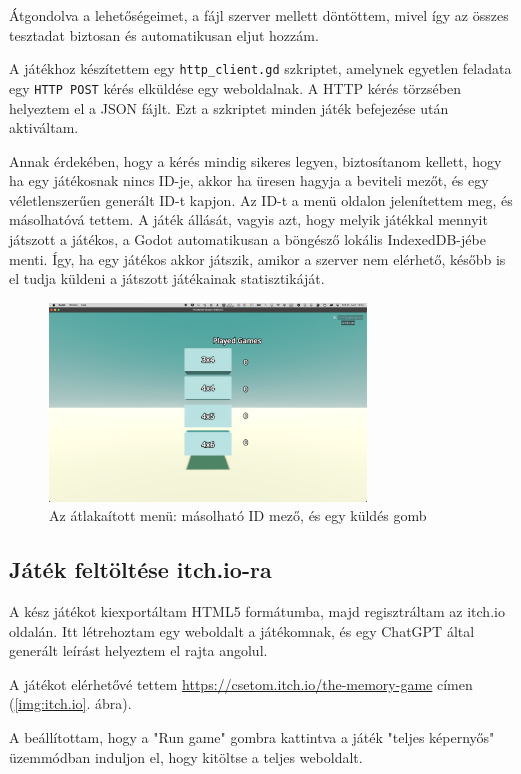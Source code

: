 Átgondolva a lehetőségeimet, a fájl szerver mellett döntöttem, mivel így az összes tesztadat biztosan és automatikusan eljut hozzám.

A játékhoz készítettem egy \lstinline{http_client.gd} szkriptet, amelynek egyetlen feladata egy \lstinline{HTTP POST} kérés elküldése egy weboldalnak. A HTTP kérés törzsében helyeztem el a JSON fájlt. Ezt a szkriptet minden játék befejezése után aktiváltam.

Annak érdekében, hogy a kérés mindig sikeres legyen, biztosítanom kellett, 
hogy ha egy játékosnak nincs ID-je, akkor ha üresen hagyja a beviteli mezőt, 
és egy véletlenszerűen generált ID-t kapjon. 
Az ID-t a menü oldalon jelenítettem meg, és másolhatóvá tettem.
A játék állását, vagyis azt, hogy melyik játékkal mennyit játszott a játékos, a Godot automatikusan a böngésző lokális IndexedDB-jébe menti.
Így, ha egy játékos akkor játszik, amikor a szerver nem elérhető, később is el tudja küldeni a játszott játékainak statisztikáját.\begin{figure}[h]
    \centering
    \includegraphics[width=0.75\textwidth]{img/menu_remake.png}
    \caption{Az átlakaított menü: másolható ID mező, és egy küldés gomb}
    \label{img:menu_remake}  
\end{figure}

\subsection{Játék feltöltése itch.io-ra}

A kész játékot kiexportáltam HTML5 formátumba, majd regisztráltam az itch.io oldalán.
Itt létrehoztam egy weboldalt a játékomnak, és egy ChatGPT által generált leírást helyeztem el rajta angolul.

A játékot elérhetővé tettem \url{https://csetom.itch.io/the-memory-game} címen (\ref{img:itch.io}. ábra). 

A beállítottam, hogy a "Run game" gombra kattintva a játék "teljes képernyős" üzemmódban induljon el, hogy kitöltse a teljes weboldalt. 


